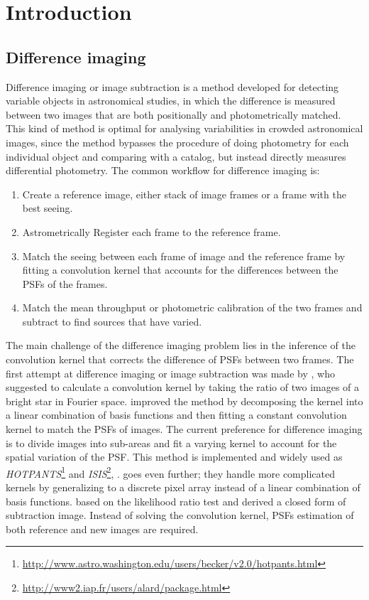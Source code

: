 \documentclass[12pt, preprint]{aastex}
\newcommand{\project}[1]{\textsl{#1}}
\begin{document}

\section{Introduction}

\subsection{Difference imaging}
Difference imaging or image subtraction is a method developed for detecting variable objects in astronomical studies, in which the difference is measured between two images that are both positionally and photometrically matched. This kind of method is optimal for analysing variabilities in crowded astronomical images, since the method bypasses the procedure of doing photometry for each individual object and comparing with a catalog, but instead directly measures differential photometry.
The common workflow for difference imaging is:
\begin{enumerate}
\item
Create a reference image, either stack of image frames or a frame with the best seeing.
\item
Astrometrically Register each frame to the reference frame.
\item
Match the seeing between each frame of image and the reference frame by fitting a convolution kernel that accounts for the differences between the PSFs of the frames.
\item
Match the mean throughput or photometric calibration of the two frames and subtract to find sources that have varied.
\end{enumerate}
The main challenge of the difference imaging problem lies in the inference of the convolution kernel that corrects the difference of PSFs between two frames.
The first attempt at difference imaging or image subtraction was made by \cite{imagesub1}, who suggested to calculate a convolution kernel by taking the ratio of two images of a bright star in Fourier space. 
\cite{alard} improved the method by decomposing the kernel into a linear combination of basis functions and then fitting a constant convolution kernel to match the PSFs of images.
The current preference for difference imaging \citep{varyingkernel} is to divide images into sub-areas and fit a varying kernel to account for the spatial variation of the PSF. 
This method is implemented and widely used as \project{HOTPANTS}\footnote{\url{http://www.astro.washington.edu/users/becker/v2.0/hotpants.html}} and \project{ISIS}\footnote{\url{http://www2.iap.fr/users/alard/package.html}}, \cite{varyingkernel}. 
\cite{bramich} goes even further; they handle more complicated kernels by generalizing to a discrete pixel array instead of a linear combination of basis functions.
\cite{optimal} based on the likelihood ratio test and derived a closed form of subtraction image.
Instead of solving the convolution kernel, PSFs estimation of both reference and new images are required.
\end{document}

